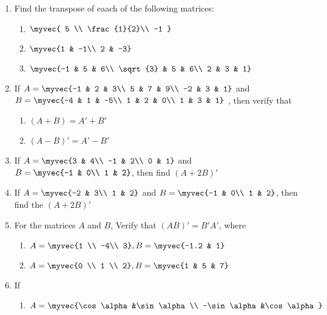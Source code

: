 \begin{enumerate}
\item Find the transpose of eaach of the following matrices:
\begin{enumerate}[label=(\roman*)]
\item $\myvec{ 5 \\ \frac{1}{2}\\ -1 }$
\item $\myvec {1 & -1\\ 2 & -3}$
\item $\myvec{-1 & 5 & 6\\ \sqrt{3} & 5 & 6\\ 2 & 3 & 1}$
\end{enumerate}
\item If $A=\myvec {-1 & 2 & 3\\ 5 & 7 & 9\\ -2 & 3 & 1}$ and $B= \myvec{-4 & 1 & -5\\ 1 & 2 & 0\\ 1 & 3 & 1}$
, then verify that
\begin{enumerate}
\item $(A+B)=A'+B'$
\item $(A-B)'=A'-B'$
\end{enumerate}
\item If $A=\myvec{3 & 4\\ -1 & 2\\ 0 & 1}$ and $B=\myvec{-1 & 0\\ 1 & 2}$, then find $(A+2B)'$
\item If $A=\myvec{-2 & 3\\ 1 & 2}$ and $B=\myvec{-1 & 0\\ 1 & 2} $, then find the $(A+2B)'$
\item For the matrices $A$ and $B$, Verify that $(AB)'= B'A'$, where 
\begin{enumerate}[label=(\roman*)]
\item $A=\myvec {1 \\ -4\\  3} , B=\myvec {-1.2 & 1}$
\item $A=\myvec {0  \\ 1 \\ 2} , B=\myvec {1 & 5 & 7}$
\end{enumerate}
\item If 
\begin{enumerate}[label=(\roman*)]
\item $A=\myvec {\cos \alpha &\sin \alpha \\ -\sin \alpha &\cos \alpha }$

\end{enumerate}
\end{enumerate}
